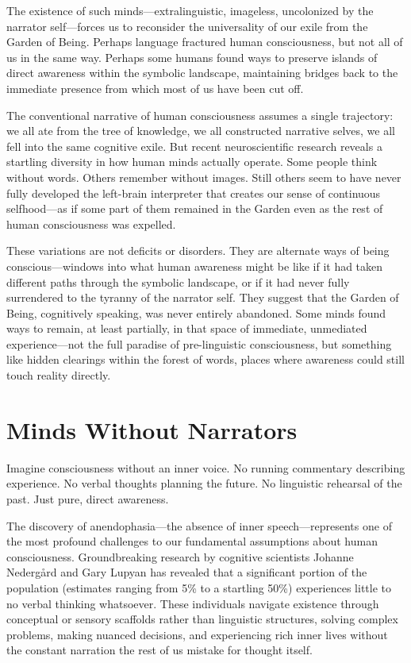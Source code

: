 The existence of such minds—extralinguistic, imageless, uncolonized by the narrator self—forces us to reconsider the universality of our exile from the Garden of Being. Perhaps language fractured human consciousness, but not all of us in the same way. Perhaps some humans found ways to preserve islands of direct awareness within the symbolic landscape, maintaining bridges back to the immediate presence from which most of us have been cut off.

The conventional narrative of human consciousness assumes a single trajectory: we all ate from the tree of knowledge, we all constructed narrative selves, we all fell into the same cognitive exile. But recent neuroscientific research reveals a startling diversity in how human minds actually operate. Some people think without words. Others remember without images. Still others seem to have never fully developed the left-brain interpreter that creates our sense of continuous selfhood—as if some part of them remained in the Garden even as the rest of human consciousness was expelled.

These variations are not deficits or disorders. They are alternate ways of being conscious—windows into what human awareness might be like if it had taken different paths through the symbolic landscape, or if it had never fully surrendered to the tyranny of the narrator self. They suggest that the Garden of Being, cognitively speaking, was never entirely abandoned. Some minds found ways to remain, at least partially, in that space of immediate, unmediated experience—not the full paradise of pre-linguistic consciousness, but something like hidden clearings within the forest of words, places where awareness could still touch reality directly.

\section{Minds Without Narrators}

Imagine consciousness without an inner voice.
No running commentary describing experience.
No verbal thoughts planning the future.
No linguistic rehearsal of the past.
Just pure, direct awareness.

The discovery of anendophasia—the absence of inner speech—represents one of the most profound challenges to our fundamental assumptions about human consciousness. Groundbreaking research by cognitive scientists Johanne Nedergård and Gary Lupyan has revealed that a significant portion of the population (estimates ranging from 5\% to a startling 50\%) experiences little to no verbal thinking whatsoever. These individuals navigate existence through conceptual or sensory scaffolds rather than linguistic structures, solving complex problems, making nuanced decisions, and experiencing rich inner lives without the constant narration the rest of us mistake for thought itself.

